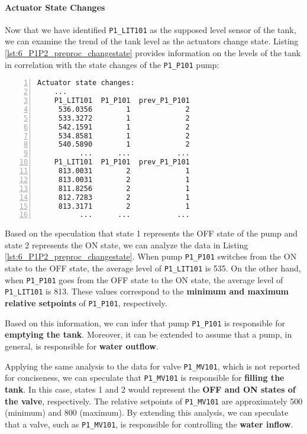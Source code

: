 \paragraph{Actuator State Changes}
\label{par:6_preproc_P1P2_actuator_state_changes}
Now that we have identified \texttt{P1\_LIT101} as the supposed level sensor of the tank, we can examine the trend of the tank level as the actuators change state. Listing \ref{lst:6_P1P2_preproc_changestate} provides information on the levels of the tank in correlation with the state changes of the \texttt{P1\_P101} pump:

\begin{lstlisting}[language=bash, numbers=left, caption=\texttt{P1\_P101} state changes in relation to \texttt{P1\_LIT101}, label=lst:6_P1P2_preproc_changestate]
	Actuator state changes:
	...
	P1_LIT101  P1_P101  prev_P1_P101
	 536.0356        1             2
	 533.3272        1             2
	 542.1591        1             2
	 534.8581        1             2
	 540.5890        1             2
	      ...      ...           ...
	P1_LIT101  P1_P101  prev_P1_P101
	 813.0031        2             1
	 813.0031        2             1
	 811.8256        2             1
	 812.7283        2             1
	 813.3171        2             1
	      ...      ...           ...
\end{lstlisting}

Based on the speculation that state 1 represents the OFF state of the pump and state 2 represents the ON state, we can analyze the data in Listing \ref{lst:6_P1P2_preproc_changestate}. When pump \texttt{P1\_P101} switches from the ON state to the OFF state, the average level of \texttt{P1\_LIT101} is 535. On the other hand, when \texttt{P1\_P101} goes from the OFF state to the ON state, the average level of \texttt{P1\_LIT101} is 813. These values correspond to the \textbf{minimum and maximum relative setpoints} of \texttt{P1\_P101}, respectively. 

Based on this information, we can infer that pump \texttt{P1\_P101} is responsible for \textbf{emptying the tank}. Moreover, it can be extended to assume that a pump, in general, is responsible for \textbf{water outflow}.

\bigskip
Applying the same analysis to the data for valve \texttt{P1\_MV101}, which is not reported for conciseness, we can speculate that \texttt{P1\_MV101} is responsible for \textbf{filling the tank}. In this case, states 1 and 2 would represent the \textbf{OFF and ON states of the valve}, respectively. The relative setpoints of \texttt{P1\_MV101} are approximately 500 (minimum) and 800 (maximum).
By extending this analysis, we can speculate that a valve, such as \texttt{P1\_MV101}, is responsible for controlling the \textbf{water inflow}.

